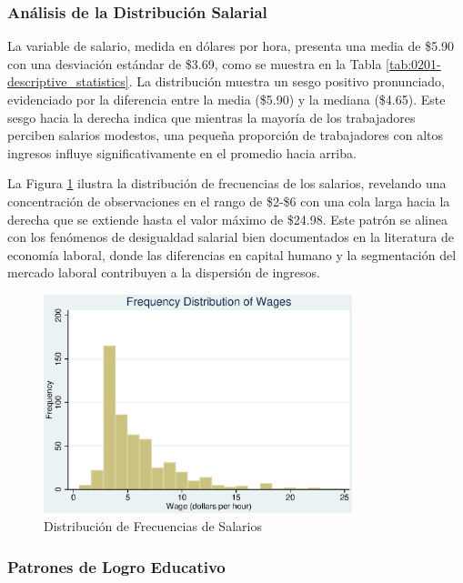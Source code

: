 \documentclass[12pt]{article}
\begin{document}


\subsubsection*{Análisis de la Distribución Salarial}

La variable de salario, medida en dólares por hora, presenta una media de \$5.90 con una desviación estándar de \$3.69, como se muestra en la Tabla \ref{tab:0201-descriptive_statistics}. La distribución muestra un sesgo positivo pronunciado, evidenciado por la diferencia entre la media (\$5.90) y la mediana (\$4.65). Este sesgo hacia la derecha indica que mientras la mayoría de los trabajadores perciben salarios modestos, una pequeña proporción de trabajadores con altos ingresos influye significativamente en el promedio hacia arriba.

La Figura \ref{fig:hist_wage} ilustra la distribución de frecuencias de los salarios, revelando una concentración de observaciones en el rango de \$2-\$6 con una cola larga hacia la derecha que se extiende hasta el valor máximo de \$24.98. Este patrón se alinea con los fenómenos de desigualdad salarial bien documentados en la literatura de economía laboral, donde las diferencias en capital humano y la segmentación del mercado laboral contribuyen a la dispersión de ingresos.

\begin{figure}[h!]
\centering
\includegraphics[width=0.8\textwidth]{Figures/0201-hist_wage.eps}
\caption{Distribución de Frecuencias de Salarios}
\label{fig:hist_wage}
\end{figure}

\subsubsection*{Patrones de Logro Educativo}
\end{document}
